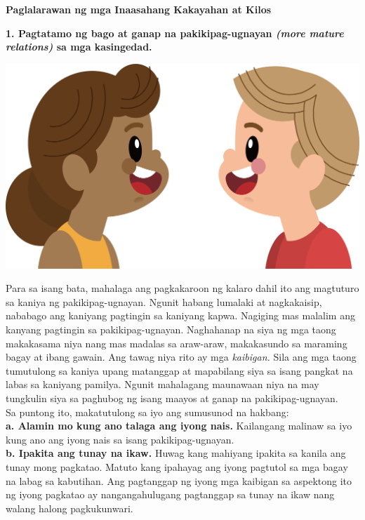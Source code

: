 \documentclass[10pt,a4paper]{article}
\newcommand{\NewsItem}[1]{%
		\usefont{T1}{augie}{m}{n} 	
		\large #1 \vspace{4pt}
		\par \normalsize \normalfont}
\begin{document}
\begin{multicols*}{3}
\NewsItem{\textbf{Paglalarawan ng mga Inaasahang Kakayahan at Kilos}}
	\textbf{1. Pagtatamo ng bago at ganap na pakikipag-ugnayan \textit{(more mature relations)} sa mga kasingedad.}\\
	\begin{center}
			\includegraphics[width=0.8\linewidth]{G7_Modyul_Images/child-youth-clip-art-happy-talking-kids-5a8a8a9069c803_0378748615190288804333.png}
		\end{center}
	Para sa isang bata, mahalaga ang pagkakaroon ng kalaro dahil ito ang magtuturo sa kaniya ng pakikipag-ugnayan. Ngunit habang lumalaki at nagkakaisip, nababago ang kaniyang pagtingin sa kaniyang kapwa. Nagiging mas malalim ang kanyang pagtingin sa pakikipag-ugnayan. Naghahanap na siya ng mga taong makakasama niya nang mas madalas sa araw-araw, makakasundo sa maraming bagay at ibang gawain. Ang tawag niya rito ay mga \textit{kaibigan.} Sila ang mga taong tumutulong sa kaniya upang matanggap at mapabilang siya sa isang pangkat na labas sa kaniyang pamilya. Ngunit mahalagang maunawaan niya na may tungkulin siya sa paghubog ng isang maayos at ganap na pakikipag-ugnayan.\\
	Sa puntong ito, makatutulong sa iyo ang sumusunod na hakbang:\\
		    \textbf{a. Alamin mo kung ano talaga ang iyong nais.} Kailangang malinaw sa iyo kung ano ang iyong nais sa isang pakikipag-ugnayan.\\
		    \textbf{b. Ipakita ang tunay na ikaw.} Huwag kang mahiyang ipakita sa kanila ang tunay mong pagkatao. Matuto kang ipahayag ang iyong pagtutol sa mga bagay na labag sa kabutihan. Ang pagtanggap ng iyong mga kaibigan sa aspektong ito ng iyong pagkatao ay nangangahulugang pagtanggap sa tunay na ikaw nang walang halong pagkukunwari.
		\begin{center}

\end{center}
\end{multicols*}
\end{document}
